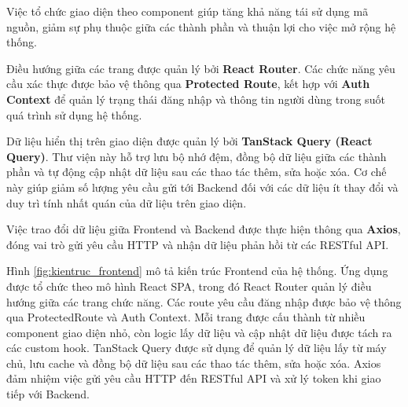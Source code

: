 \documentclass[12pt, a4paper]{report}
\begin{document}
Việc tổ chức giao diện theo component giúp tăng khả năng tái sử dụng mã nguồn, giảm sự phụ thuộc giữa các thành phần và thuận lợi cho việc mở rộng hệ thống.

Điều hướng giữa các trang được quản lý bởi \textbf{React Router}. Các chức năng yêu cầu xác thực được bảo vệ thông qua \textbf{Protected Route}, kết hợp với \textbf{Auth Context} để quản lý trạng thái đăng nhập và thông tin người dùng trong suốt quá trình sử dụng hệ thống.

Dữ liệu hiển thị trên giao diện được quản lý bởi \textbf{TanStack Query (React Query)}. Thư viện này hỗ trợ lưu bộ nhớ đệm, đồng bộ dữ liệu giữa các thành phần và tự động cập nhật dữ liệu sau các thao tác thêm, sửa hoặc xóa. Cơ chế này giúp giảm số lượng yêu cầu gửi tới Backend đối với các dữ liệu ít thay đổi và duy trì tính nhất quán của dữ liệu trên giao diện.

Việc trao đổi dữ liệu giữa Frontend và Backend được thực hiện thông qua \textbf{Axios}, đóng vai trò gửi yêu cầu HTTP và nhận dữ liệu phản hồi từ các RESTful API.

Hình \ref{fig:kientruc_frontend} mô tả kiến trúc Frontend của hệ thống. Ứng dụng được tổ chức theo mô hình React SPA, trong đó React Router quản lý điều hướng giữa các trang chức năng. Các route yêu cầu đăng nhập được bảo vệ thông qua ProtectedRoute và Auth Context. Mỗi trang được cấu thành từ nhiều component giao diện nhỏ, còn logic lấy dữ liệu và cập nhật dữ liệu được tách ra các custom hook. TanStack Query được sử dụng để quản lý dữ liệu lấy từ máy chủ, lưu cache và đồng bộ dữ liệu sau các thao tác thêm, sửa hoặc xóa. Axios đảm nhiệm việc gửi yêu cầu HTTP đến RESTful API và xử lý token khi giao tiếp với Backend.
\end{document}
